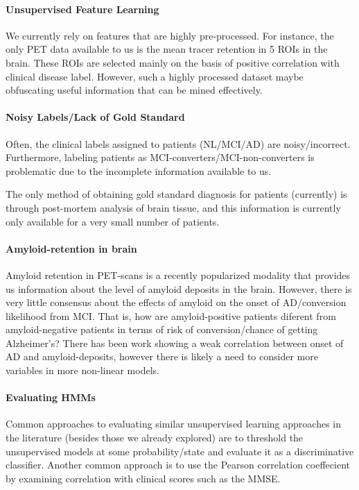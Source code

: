 \documentclass[12pt,a4paper]{article}
\begin{document}
\paragraph{Unsupervised Feature Learning}

We currently rely on features that are highly pre-processed. For
instance, the only PET data available to us is the mean tracer
retention in 5 ROIs in the brain. These ROIs are selected mainly on
the basis of positive correlation with clinical disease
label. However, such a highly processed dataset maybe obfuscating
useful information that can be mined effectively.

\paragraph{Noisy Labels/Lack of Gold Standard}

Often, the clinical labels assigned to patients (NL/MCI/AD) are
noisy/incorrect. Furthermore, labeling patients as
MCI-converters/MCI-non-converters is problematic due to the incomplete
information available to us. 

The only method of obtaining gold standard diagnosis for patients
(currently) is through post-mortem analysis of brain tissue, and this
information is currently only available for a very small number of
patients.

\paragraph{Amyloid-retention in brain}

Amyloid retention in PET-scans is a recently popularized modality that
provides us information about the level of amyloid deposits in the
brain. However, there is very little consensus about the effects of
amyloid on the onset of AD/conversion likelihood from MCI. That is,
how are amyloid-positive patients diferent from amyloid-negative
patients in terms of risk of conversion/chance of getting Alzheimer's?
There has been work showing a weak correlation between onset of AD and
amyloid-deposits, however there is likely a need to consider more
variables in more non-linear models.

\paragraph{Evaluating HMMs}

Common approaches to evaluating similar unsupervised learning
approaches in the literature (besides those we already explored) are
to threshold the unsupervised models at some probability/state and
evaluate it as a discriminative classifier. Another common approach is
to use the Pearson correlation coeffecient by examining correlation
with clinical scores such as the MMSE.
\end{document}
